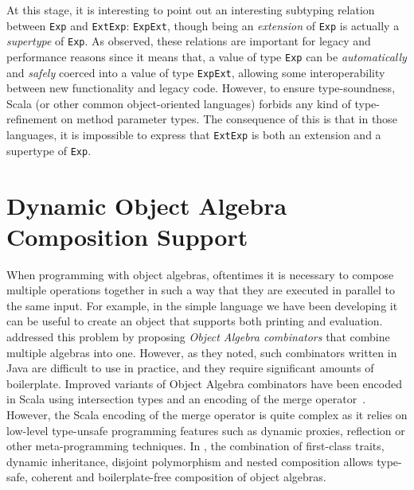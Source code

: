 At this stage, it is interesting to point out an interesting subtyping relation
between \lstinline{Exp} and \lstinline{ExtExp}: \lstinline{ExpExt}, though being an
\emph{extension} of \lstinline{Exp} is actually a \emph{supertype} of \lstinline{Exp}.
As \citet{oliveira09modular} observed, these relations are
important for legacy and performance reasons since it means that, a value of
type \lstinline{Exp} can be \emph{automatically} and \emph{safely}
coerced into a value of type \lstinline{ExpExt}, allowing some
interoperability between new functionality and legacy code.
However, to ensure type-soundness, Scala (or other common object-oriented languages) forbids any kind of type-refinement on method
parameter types. The consequence of this is that in those languages, it is
impossible to express that \lstinline{ExtExp} is both an extension and a
supertype of \lstinline{Exp}.




\section{Dynamic Object Algebra Composition Support}
\label{sec:case:combinator}

When programming with object algebras, oftentimes it is necessary to compose
multiple operations together in such a way that they are executed in parallel to
the same input. For example, in the simple language we have been developing it
can be useful to create an object that supports both printing and evaluation.
\citet{oliveira2012extensibility} addressed this problem by
proposing \emph{Object Algebra combinators} that combine multiple algebras into
one. However, as they noted, such combinators written in Java are difficult to
use in practice, and they require significant amounts of boilerplate. Improved
variants of Object Algebra combinators have been encoded in Scala using
intersection types and an encoding of the merge
operator~\citep{oliveira2013feature, rendel14attributes}. However, the Scala
encoding of the merge operator is quite complex as it relies on low-level
type-unsafe programming features such as dynamic proxies, reflection or other
meta-programming techniques. In \sedel, the combination of first-class traits,
dynamic inheritance, disjoint polymorphism and nested composition allows type-safe, coherent and
boilerplate-free composition of object algebras.

